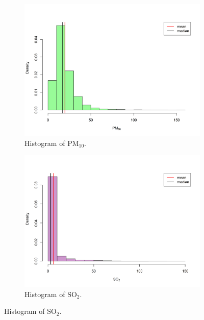 \documentclass[a4paper, 10pt]{article}
\begin{document}
         \begin{figure}[H]
            \centering
            \begin{subfigure}[t]{0.48\linewidth}
               \centering
               \includegraphics[width=\linewidth]{../images/PM10_hist_2019.png}
               \caption{Histogram of $\text{PM}_{10}$.}
            \end{subfigure}
            \hfill
            \begin{subfigure}[t]{0.48\linewidth}
               \centering
               \includegraphics[width=\linewidth]{../images/SO2_hist_2019.png}
               \caption{Histogram of $\text{SO}_{2}$.}
            \end{subfigure}

\end{figure}
\end{document}
